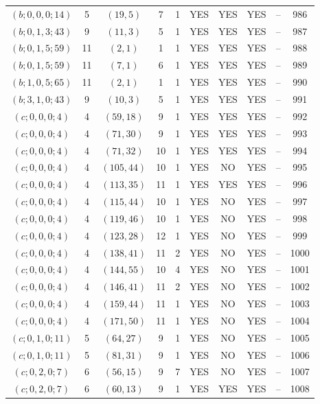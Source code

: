 \begin{longtable}{|c|c|c|c|c|c|c|c|c|c|}
$(b; 0, 0, 0; 14)$ & 5 & $(19, 5)$ & 7 & 1 & YES & YES & YES & -- & 986\\
$(b; 0, 1, 3; 43)$ & 9 & $(11, 3)$ & 5 & 1 & YES & YES & YES & -- & 987\\
$(b; 0, 1, 5; 59)$ & 11 & $(2, 1)$ & 1 & 1 & YES & YES & YES & -- & 988\\
$(b; 0, 1, 5; 59)$ & 11 & $(7, 1)$ & 6 & 1 & YES & YES & YES & -- & 989\\
$(b; 1, 0, 5; 65)$ & 11 & $(2, 1)$ & 1 & 1 & YES & YES & YES & -- & 990\\
$(b; 3, 1, 0; 43)$ & 9 & $(10, 3)$ & 5 & 1 & YES & YES & YES & -- & 991\\
$(c; 0, 0, 0; 4)$ & 4 & $(59, 18)$ & 9 & 1 & YES & YES & YES & -- & 992\\
$(c; 0, 0, 0; 4)$ & 4 & $(71, 30)$ & 9 & 1 & YES & YES & YES & -- & 993\\
$(c; 0, 0, 0; 4)$ & 4 & $(71, 32)$ & 10 & 1 & YES & YES & YES & -- & 994\\
$(c; 0, 0, 0; 4)$ & 4 & $(105, 44)$ & 10 & 1 & YES & NO & YES & -- & 995\\
$(c; 0, 0, 0; 4)$ & 4 & $(113, 35)$ & 11 & 1 & YES & YES & YES & -- & 996\\
$(c; 0, 0, 0; 4)$ & 4 & $(115, 44)$ & 10 & 1 & YES & NO & YES & -- & 997\\
$(c; 0, 0, 0; 4)$ & 4 & $(119, 46)$ & 10 & 1 & YES & NO & YES & -- & 998\\
$(c; 0, 0, 0; 4)$ & 4 & $(123, 28)$ & 12 & 1 & YES & NO & YES & -- & 999\\
$(c; 0, 0, 0; 4)$ & 4 & $(138, 41)$ & 11 & 2 & YES & NO & YES & -- & 1000\\
$(c; 0, 0, 0; 4)$ & 4 & $(144, 55)$ & 10 & 4 & YES & NO & YES & -- & 1001\\
$(c; 0, 0, 0; 4)$ & 4 & $(146, 41)$ & 11 & 2 & YES & NO & YES & -- & 1002\\
$(c; 0, 0, 0; 4)$ & 4 & $(159, 44)$ & 11 & 1 & YES & NO & YES & -- & 1003\\
$(c; 0, 0, 0; 4)$ & 4 & $(171, 50)$ & 11 & 1 & YES & NO & YES & -- & 1004\\
$(c; 0, 1, 0; 11)$ & 5 & $(64, 27)$ & 9 & 1 & YES & NO & YES & -- & 1005\\
$(c; 0, 1, 0; 11)$ & 5 & $(81, 31)$ & 9 & 1 & YES & NO & YES & -- & 1006\\
$(c; 0, 2, 0; 7)$ & 6 & $(56, 15)$ & 9 & 7 & YES & NO & YES & -- & 1007\\
$(c; 0, 2, 0; 7)$ & 6 & $(60, 13)$ & 9 & 1 & YES & YES & YES & -- & 1008\\

\end{longtable}
